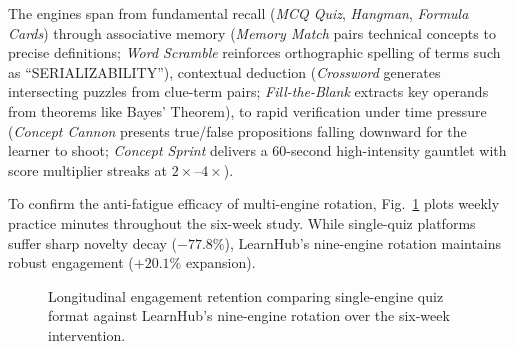 \documentclass[journal]{IEEEtran}
\begin{document}
The engines span from fundamental recall (\emph{MCQ Quiz}, \emph{Hangman}, \emph{Formula Cards}) through associative memory (\emph{Memory Match} pairs technical concepts to precise definitions; \emph{Word Scramble} reinforces orthographic spelling of terms such as ``SERIALIZABILITY''), contextual deduction (\emph{Crossword} generates intersecting puzzles from clue-term pairs; \emph{Fill-the-Blank} extracts key operands from theorems like Bayes' Theorem), to rapid verification under time pressure (\emph{Concept Cannon} presents true/false propositions falling downward for the learner to shoot; \emph{Concept Sprint} delivers a 60-second high-intensity gauntlet with score multiplier streaks at $2\times$--$4\times$).

To confirm the anti-fatigue efficacy of multi-engine rotation, Fig.~\ref{fig:novelty_decay} plots weekly practice minutes throughout the six-week study. While single-quiz platforms suffer sharp novelty decay ($-77.8\%$), LearnHub's nine-engine rotation maintains robust engagement ($+20.1\%$ expansion).

\begin{figure}[!t]
\centering
{}
\caption{Longitudinal engagement retention comparing single-engine quiz format against LearnHub's nine-engine rotation over the six-week intervention.}
\label{fig:novelty_decay}
\end{figure}
\end{document}

